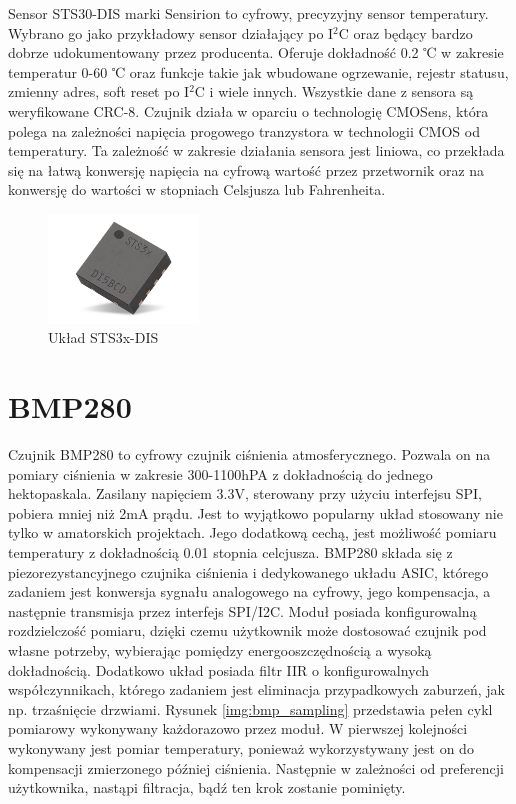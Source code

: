 Sensor STS30-DIS marki Sensirion to cyfrowy, precyzyjny sensor temperatury. Wybrano go jako przykładowy sensor działający po I$^2$C oraz będący bardzo dobrze udokumentowany przez producenta. Oferuje dokładność 0.2 ℃ w zakresie temperatur 0-60 ℃ oraz funkcje takie jak wbudowane ogrzewanie, rejestr statusu, zmienny adres, soft reset po I$^2$C i wiele innych\cite{sts_datasheet}. Wszystkie dane z sensora są weryfikowane CRC-8. Czujnik działa w oparciu o technologię CMOSens\texttrademark, która polega na zależności napięcia progowego tranzystora w technologii CMOS od temperatury. Ta zależność w zakresie działania sensora jest liniowa, co przekłada się na łatwą konwersję napięcia na cyfrową wartość przez przetwornik oraz na konwersję do wartości w stopniach Celsjusza lub Fahrenheita. 
\begin{figure}[H]
    \centering
    \includegraphics[width=4cm]{Graphics/sts_img.png}
    \caption{Układ STS3x-DIS\cite{sts_mouser}}
    \label{img:sts_mouser}
\end{figure}

\section{BMP280}

Czujnik BMP280 to cyfrowy czujnik ciśnienia atmosferycznego. Pozwala on na pomiary ciśnienia w zakresie 300-1100hPA z dokładnością do jednego hektopaskala. Zasilany napięciem 3.3V, sterowany przy użyciu interfejsu SPI, pobiera mniej niż 2mA prądu. Jest to wyjątkowo popularny układ stosowany nie tylko w amatorskich projektach. Jego dodatkową cechą, jest możliwość pomiaru temperatury z dokładnością 0.01 stopnia celcjusza\cite{bmp_datasheet}.
\newline
BMP280 składa się z piezorezystancyjnego czujnika ciśnienia i dedykowanego układu ASIC, którego zadaniem jest konwersja sygnału analogowego na cyfrowy, jego kompensacja, a następnie transmisja przez interfejs SPI/I2C. Moduł posiada konfigurowalną rozdzielczość pomiaru, dzięki czemu użytkownik może dostosować czujnik pod własne potrzeby, wybierając pomiędzy energooszczędnością a wysoką dokładnością. Dodatkowo układ posiada filtr IIR o konfigurowalnych współczynnikach, którego zadaniem jest eliminacja przypadkowych zaburzeń, jak np. trzaśnięcie drzwiami.
\newline
Rysunek \ref{img:bmp_sampling} przedstawia pełen cykl pomiarowy wykonywany każdorazowo przez moduł. W pierwszej kolejności wykonywany jest pomiar temperatury, ponieważ wykorzystywany jest on do kompensacji zmierzonego później ciśnienia. Następnie w zależności od preferencji użytkownika, nastąpi filtracja, bądź ten krok zostanie pominięty. 

